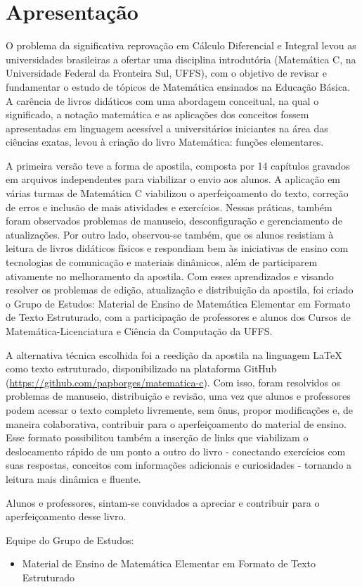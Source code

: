 \section*{Apresentação}

O problema da significativa reprovação em Cálculo Diferencial e Integral levou
as universidades brasileiras a ofertar uma disciplina introdutória (Matemática C, na
Universidade Federal da Fronteira Sul, UFFS), com o objetivo de revisar e fundamentar
o estudo de tópicos de Matemática ensinados na Educação Básica. A carência de livros
didáticos com uma abordagem conceitual, na qual o significado, a notação matemática e
as aplicações dos conceitos fossem apresentadas em linguagem acessível a
universitários iniciantes na área das ciências exatas, levou à criação do livro
Matemática: funções elementares.

A primeira versão teve a forma de apostila, composta por 14 capítulos gravados
em arquivos independentes para viabilizar o envio aos alunos. A aplicação em várias
turmas de Matemática C viabilizou o aperfeiçoamento do texto, correção de erros e
inclusão de mais atividades e exercícios. Nessas práticas, também foram observados
problemas de manuseio, desconfiguração e gerenciamento de atualizações. Por outro
lado, observou-se também, que os alunos resistiam à leitura de livros didáticos físicos e
respondiam bem às iniciativas de ensino com tecnologias de comunicação e materiais
dinâmicos, além de participarem ativamente no melhoramento da apostila. Com esses
aprendizados e visando resolver os problemas de edição, atualização e distribuição da
apostila, foi criado o Grupo de Estudos: Material de Ensino de Matemática Elementar
em Formato de Texto Estruturado, com a participação de professores e alunos dos
Cursos de Matemática-Licenciatura e Ciência da Computação da UFFS.

A alternativa técnica escolhida foi a reedição da apostila na linguagem \LaTeX
como texto estruturado, disponibilizado na plataforma GitHub (\href{https://github.com/papborges/matematica-c}{https://github.com/papborges/matematica-c}). Com
isso, foram resolvidos os problemas de manuseio, distribuição e revisão, uma vez que
alunos e professores podem acessar o texto completo livremente, sem ônus, propor
modificações e, de maneira colaborativa, contribuir para o aperfeiçoamento do material
de ensino. Esse formato possibilitou também a inserção de links que viabilizam o
deslocamento rápido de um ponto a outro do livro - conectando exercícios com suas
respostas, conceitos com informações adicionais e curiosidades - tornando a leitura mais
dinâmica e fluente.

Alunos e professores, sintam-se convidados a apreciar e contribuir para o
aperfeiçoamento desse livro.

Equipe do Grupo de Estudos:

\begin{itemize}
    \item Material de Ensino de Matemática Elementar em Formato de Texto Estruturado
\end{itemize}
